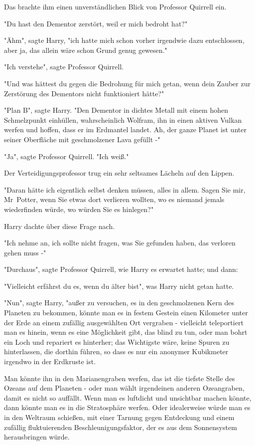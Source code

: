 {Das brachte ihm einen unverständlichen Blick von Professor Quirrell ein.

"Du hast den Dementor zerstört, weil er mich bedroht hat?"

"Ähm", sagte Harry, "ich hatte mich schon vorher irgendwie dazu entschlossen, aber ja, das allein wäre schon Grund genug gewesen."

"Ich verstehe", sagte Professor Quirrell.

"Und was hättest du gegen die Bedrohung für mich getan, wenn dein Zauber zur Zerstörung des Dementors nicht funktioniert hätte?"

"Plan B", sagte Harry. "Den Dementor in dichtes Metall mit einem hohen Schmelzpunkt einhüllen, wahrscheinlich Wolfram, ihn in einen aktiven Vulkan werfen und hoffen, dass er im Erdmantel landet. Ah, der ganze Planet ist unter seiner Oberfläche mit geschmolzener Lava gefüllt -"

"Ja", sagte Professor Quirrell. "Ich weiß."

Der Verteidigungsprofessor trug ein sehr seltsames Lächeln auf den Lippen.

"Daran hätte ich eigentlich selbst denken müssen, alles in allem. Sagen Sie mir, Mr~Potter, wenn Sie etwas dort verlieren wollten, wo es niemand jemals wiederfinden würde, wo würden Sie es hinlegen?"

Harry dachte über diese Frage nach.

"Ich nehme an, ich sollte nicht fragen, was Sie gefunden haben, das verloren gehen muss -"

"Durchaus", sagte Professor Quirrell, wie Harry es erwartet hatte; und dann:

"Vielleicht erfährst du es, wenn du älter bist", was Harry nicht getan hatte.

"Nun", sagte Harry, "außer zu versuchen, es in den geschmolzenen Kern des Planeten zu bekommen, könnte man es in festem Gestein einen Kilometer unter der Erde an einem zufällig ausgewählten Ort vergraben - vielleicht teleportiert man es hinein, wenn es eine Möglichkeit gibt, das blind zu tun, oder man bohrt ein Loch und repariert es hinterher; das Wichtigste wäre, keine Spuren zu hinterlassen, die dorthin führen, so dass es nur ein anonymer Kubikmeter irgendwo in der Erdkruste ist.

Man könnte ihn in den Marianengraben werfen, das ist die tiefste Stelle des Ozeans auf dem Planeten - oder man wählt irgendeinen anderen Ozeangraben, damit es nicht so auffällt. Wenn man es luftdicht und unsichtbar machen könnte, dann könnte man es in die Stratosphäre werfen. Oder idealerweise würde man es in den Weltraum schießen, mit einer Tarnung gegen Entdeckung und einem zufällig fluktuierenden Beschleunigungsfaktor, der es aus dem Sonnensystem herausbringen würde.

}
